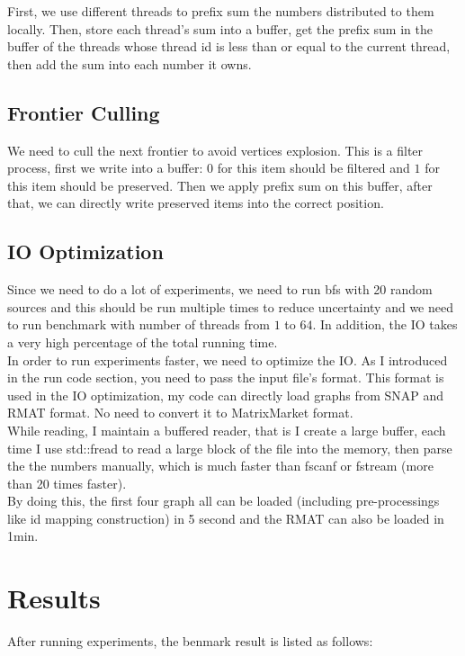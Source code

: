 \documentclass[10pt,twocolumn,letterpaper]{article}
\begin{document}
First, we use different threads to prefix sum the numbers distributed to them locally. Then, store each thread's sum into a buffer, get the prefix sum in the buffer of the threads whose thread id is less than or equal to the current thread, then add the sum into each number it owns.

\subsection{Frontier Culling}

We need to cull the next frontier to avoid vertices explosion. This is a filter process, first we write into a buffer: $0$ for this item should be filtered and $1$ for this item should be preserved. Then we apply prefix sum on this buffer, after that, we can directly write preserved items into the correct position.

\subsection{IO Optimization}

Since we need to do a lot of experiments, we need to run bfs with 20 random sources and this should be run multiple times to reduce uncertainty and we need to run benchmark with number of threads from $1$ to $64$. In addition, the IO takes a very high percentage of the total running time.\\
In order to run experiments faster, we need to optimize the IO. As I introduced in the run code section, you need to pass the input file's format. This format is used in the IO optimization, my code can directly load graphs from SNAP and RMAT format. No need to convert it to MatrixMarket format.\\
While reading, I maintain a buffered reader, that is I create a large buffer, each time I use std::fread to read a large block of the file into the memory, then parse the the numbers manually, which is much faster than fscanf or fstream (more than 20 times faster).\\
By doing this, the first four graph all can be loaded (including pre-processings like id mapping construction) in 5 second and the RMAT can also be loaded in 1min.

\section{Results}

After running experiments, the benmark result is listed as follows:
\end{document}
